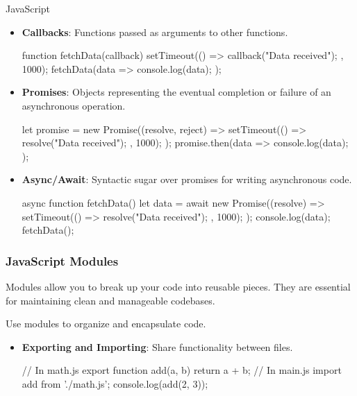 \begin{notes}{JavaScript}
\begin{highlight}
        \begin{itemize}
            \item \textbf{Callbacks}: Functions passed as arguments to other functions.
    \begin{code}[JavaScript]
    function fetchData(callback) {
        setTimeout(() => {
            callback("Data received");
        }, 1000);
    }
    fetchData(data => {
        console.log(data);
    });
    \end{code}
            \item \textbf{Promises}: Objects representing the eventual completion or failure of an asynchronous operation.
    \begin{code}[JavaScript]
    let promise = new Promise((resolve, reject) => {
        setTimeout(() => {
            resolve("Data received");
        }, 1000);
    });
    promise.then(data => {
        console.log(data);
    });
    \end{code}
            \item \textbf{Async/Await}: Syntactic sugar over promises for writing asynchronous code.
    \begin{code}[JavaScript]
    async function fetchData() {
        let data = await new Promise((resolve) => {
            setTimeout(() => {
                resolve("Data received");
            }, 1000);
        });
        console.log(data);
    }
    fetchData();
    \end{code}
        \end{itemize}
    
    \end{highlight}
    
    \subsubsection*{JavaScript Modules}
    
    Modules allow you to break up your code into reusable pieces. They are essential for maintaining clean and manageable codebases.
    
    \begin{highlight}
    
        Use modules to organize and encapsulate code.
        
        \begin{itemize}
            \item \textbf{Exporting and Importing}: Share functionality between files.
    \begin{code}[JavaScript]
    // In math.js
    export function add(a, b) {
        return a + b;
    }
    // In main.js
    import { add } from './math.js';
    console.log(add(2, 3));
    \end{code}
        \end{itemize}
    

\end{highlight}
\end{notes}
